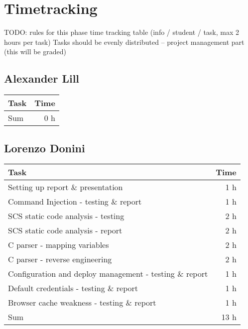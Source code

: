 \chapter{Timetracking}\label{chapter:timetracking}

TODO: rules for this phase\newline
time tracking table (info / student / task, max 2 hours per task)
Tasks should be evenly distributed – project management part (this will be graded)\newline

\section*{Alexander Lill}
\begin{table}[h!tpb]
  \centering
  \begin{tabularx}{\textwidth}{X r}
    \toprule
      Task & Time \\
    \midrule
    \midrule
      Sum & 0 h \\
    \bottomrule
  \end{tabularx}
\end{table}

\clearpage
\section*{Lorenzo Donini}
\begin{table}[h!tpb]
  \centering
  \begin{tabularx}{\textwidth}{X r}
    \toprule
      Task & Time \\
    \midrule
      Setting up report \& presentation & 1 h \\
      Command Injection - testing \& report & 1 h \\
      SCS static code analysis - testing & 2 h \\
      SCS static code analysis - report & 2 h \\
      C parser - mapping variables & 2 h \\
      C parser - reverse engineering & 2 h \\
      Configuration and deploy management - testing \& report & 1 h \\
      Default credentials - testing \& report & 1 h \\
      Browser cache weakness - testing \& report & 1 h \\
    \midrule
      Sum & 13 h \\
    \bottomrule
  \end{tabularx}
\end{table}

